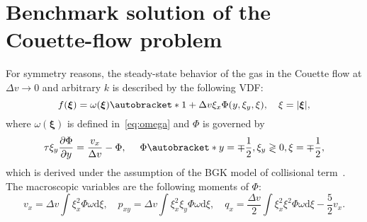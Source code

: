 \documentclass{elsarticle} %
\newcommand{\dd}{\mathrm{d}}
\newcommand{\pder}[2][]{\frac{\partial#1}{\partial#2}}
\DeclarePairedDelimiter\autobracket()       %
\newcommand{\br}[1]{\autobracket*{#1}}
\newcommand{\bxi}{\boldsymbol{\xi}}
\begin{document}
\section{Benchmark solution of the Couette-flow problem}\label{sec:benchmark_solution}

For symmetry reasons, the steady-state behavior of the gas in the Couette flow at \(\Delta{v}\to0\)
and arbitrary \(k\) is described by the following VDF:
\begin{equation}\label{eq:exact:vdf}
    f(\bxi) = \omega(\bxi)\br{ 1 + \Delta{v}\xi_x \Phi(y, \xi_y, \xi) }, \quad \xi = |\bxi|,
\end{equation}
where \(\omega(\bxi)\) is defined in~\eqref{eq:omega} and \(\Phi\) is governed by
\begin{equation}\label{eq:exact:Phi}
    \tau\xi_y\pder[\Phi]{y} = \frac{v_x}{\Delta{v}} - \Phi, \quad\
    \Phi\br{ y=\mp\frac12, \xi_y\gtrless0, \xi } = \mp\frac12,
\end{equation}
which is derived under the assumption of the BGK model of collisional term~\cite{Sone2007}.
The macroscopic variables are the following moments of \(\Phi\):
\begin{equation}\label{eq:exact:macro}
    v_x = \Delta{v}\int \xi_x^2\Phi\omega\dd\xi, \quad
    p_{xy} = \Delta{v}\int \xi_x^2\xi_y\Phi\omega\dd\xi, \quad
    q_x = \frac{\Delta{v}}2 \int \xi_x^2\xi^2\Phi\omega\dd\xi - \frac52v_x.
\end{equation}
\end{document}
